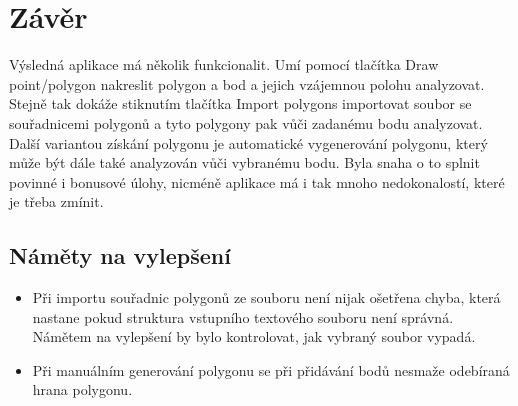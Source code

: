 \documentclass[a4paper,11pt,twoside]{article}
\begin{document}
\vspace*{-1cm}
\section{Závěr}
\noindent
\large
Výsledná aplikace má několik funkcionalit. Umí pomocí tlačítka Draw point/polygon nakreslit polygon a bod a jejich vzájemnou polohu analyzovat. Stejně tak dokáže stiknutím tlačítka Import polygons importovat soubor se souřadnicemi polygonů a tyto polygony pak vůči zadanému bodu analyzovat. Další variantou získání polygonu je automatické vygenerování polygonu, který může být dále také analyzován vůči vybranému bodu. Byla snaha o to splnit povinné i bonusové úlohy, nicméně aplikace má i tak mnoho nedokonalostí, které je třeba zmínit.

\subsection{Náměty na vylepšení}
\large
\begin{itemize}
\item Při importu souřadnic polygonů ze souboru není nijak ošetřena chyba, která nastane pokud struktura vstupního textového souboru není správná. Námětem na vylepšení by bylo kontrolovat, jak vybraný soubor vypadá.

\item Při manuálním generování polygonu se při přidávání bodů nesmaže odebíraná hrana polygonu.
\end{itemize}

\newpage
\vspace*{-6ex}
\renewcommand{\refname}{Literatura} 
    
    
 
\end{document}
